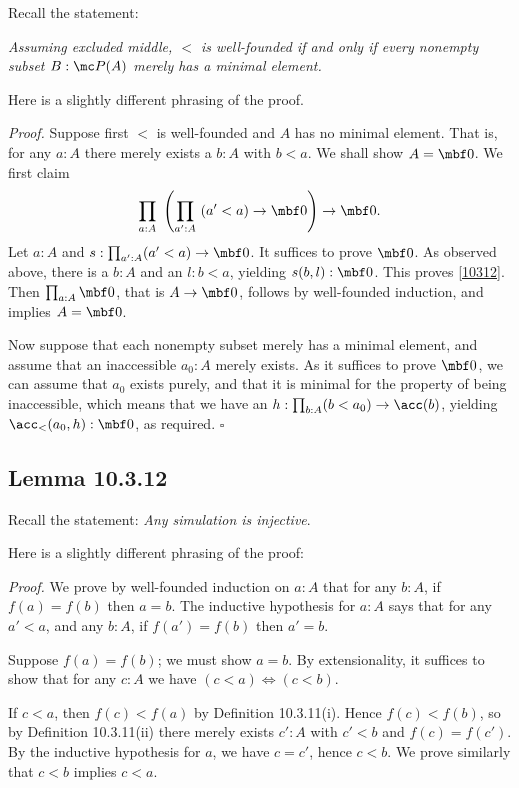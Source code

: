 \documentclass[12pt]{article}
\begin{document}
Recall the statement: 

\nn\emph{Assuming excluded middle, $<$ is well-founded if and only if every nonempty subset $B:\mc P(A)$ merely has a minimal element.} 

Here is a slightly different phrasing of the proof.

\nn\emph{Proof.} Suppose first $<$ is well-founded and $A$ has no minimal element. That is, for any $a:A$ there merely exists a $b:A$ with $b<a$. We shall show $A=\mbf0$. We first claim 
\begin{equation}\label{10312}
\prod_{a:A}\ \left(\prod_{a':A}\ (a'<a)\to\mbf0\right)\to\mbf0.
\end{equation}
Let $a:A$ and $s:\prod_{a':A}(a'<a)\to\mbf0$. It suffices to prove $\mbf0$. As observed above, there is a $b:A$ and an $l:b<a$, yielding $s(b,l):\mbf0$. This proves \eqref{10312}. Then $\prod_{a:A}\mbf0$, that is $A\to\mbf0$, follows by well-founded induction, and implies $A=\mbf0$. 

Now suppose that each nonempty subset merely has a minimal element, and assume that an inaccessible $a_0:A$ merely exists. As it suffices to prove $\mbf0$, we can assume that $a_0$ exists purely, and that it is minimal for the property of being inaccessible, which means that we have an $h:\prod_{b:A}(b<a_0)\to\acc(b)$, yielding $\acc_<(a_0,h):\mbf0$, as required. $\square$


\subsection{Lemma 10.3.12}

Recall the statement: \emph{Any simulation is injective}.

Here is a slightly different phrasing of the proof:

\nn\emph{Proof.} We prove by well-founded induction on $a:A$ that for any $b:A$, if $f(a)=f(b)$ then $a=b$. The inductive hypothesis for $a:A$ says that for any $a'<a$, and any $b:A$, if $f(a')=f(b)$ then $a'=b$.

Suppose $f(a)=f(b)$; we must show $a=b$. By extensionality, it suffices to show that for any $c:A$ we have $(c<a)\Leftrightarrow(c<b)$. 

If $c<a$, then $f(c)<f(a)$ by Definition 10.3.11(i). Hence $f(c)<f(b)$, so by Definition 10.3.11(ii) there merely exists $c':A$ with $c'<b$ and $f(c)=f(c')$. By the inductive hypothesis for $a$, we have $c=c'$, hence $c<b$. We prove similarly that $c<b$ implies $c<a$. 
\end{document}
